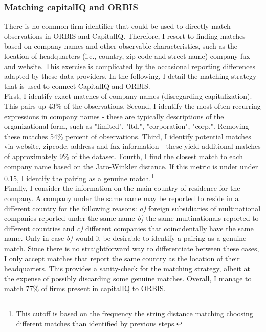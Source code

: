 \documentclass[12pt]{article}
\begin{document}
\subsubsection{Matching capitalIQ and ORBIS}
There is no common firm-identifier that could be used to directly match observations in ORBIS and CapitalIQ. Therefore, I resort to finding matches based on company-names and other observable characteristics, such as the location of headquarters (i.e., country, zip code and street name) company fax and website. This exercise is complicated by the occasional reporting differences adapted by these data providers. In the following, I detail the matching strategy that is used to connect CapitalIQ and ORBIS. \vspace{3mm} \\
First, I identify exact matches of company-names (disregarding capitalization). This pairs up 43\% of the observations. Second, I identify the most often recurring expressions in company names - these are typically descriptions of the organizational form, such as "limited", "ltd.", "corporation", "corp.". Removing these matches 54\% percent of observations. Third, I identify potential matches via website, zipcode, address and fax information - these yield additional matches of approximately 9\% of the dataset. Fourth, I find the closest match to each company name based on the Jaro-Winkler distance. If this metric is under under 0.15, I identify the pairing as a genuine match.\footnote{This cutoff is based on the frequency the string distance matching choosing different matches than identified by previous steps.} \vspace{3mm} \\
Finally, I consider the information on the main country of residence for the company. A company under the same name may be reported to reside in a different country for the following reasons: \textit{a)} foreign subsidiaries of multinational companies reported under the same name \textit{b)} the same multinationals reported to different countries and \textit{c)} different companies that coincidentally have the same name. Only in case \textit{b)} would it be desirable to identify a pairing as a genuine match. Since there is no straightforward way to differentiate between these cases, I only accept matches that report the same country as the location of their headquarters. This provides a sanity-check for the matching strategy, albeit at the expense of possibly discarding some genuine matches. Overall, I manage to match 77\% of firms present in capitalIQ to ORBIS.
\end{document}
